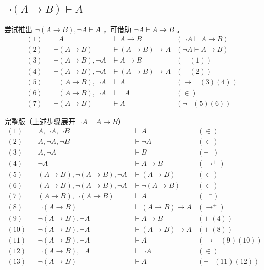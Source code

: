 \documentclass[UTF8]{ctexart}
\begin{document}
    
    \newpage
    \subsection*{$\lnot(A \to B) \vdash A$}
    尝试推出 $\lnot (A \to B), \lnot A \vdash A$ ，可借助 $\lnot A \vdash A \to B$ 。
    \begin{align*}
        (1) && \lnot A & \vdash A \to B & (\lnot A \vdash A \to B) \\
        (2) && \lnot (A \to B) & \vdash (A\to B) \to A & (\lnot A \vdash A \to B) \\
        (3) && \lnot (A \to B), \lnot A & \vdash A \to B & (+\ (1)) \\
        (4) && \lnot (A \to B), \lnot A & \vdash (A \to B) \to A & (+\ (2)) \\
        (5) && \lnot (A \to B), \lnot A & \vdash A & (\to^{-}\ (3)(4)) \\
        (6) && \lnot (A \to B), \lnot A & \vdash \lnot A & (\in) \\
        (7) && \lnot (A \to B) & \vdash A & (\lnot^{-}\ (5)(6))
    \end{align*} \par
    完整版（上述步骤展开 $\lnot A \vdash A \to B$）
    \begin{align*}
        (1) && A, \lnot A, \lnot B & \vdash A & (\in) \\
        (2) && A, \lnot A, \lnot B & \vdash \lnot A & (\in) \\
        (3) && A, \lnot A & \vdash B & (\lnot^{-}) \\
        (4) && \lnot A & \vdash A \to B & (\to^{+}) \\
        (5) && (A \to B), \lnot (A \to B), \lnot A & \vdash (A \to B) & (\in) \\
        (6) && (A \to B), \lnot (A \to B), \lnot A & \vdash \lnot (A \to B) & (\in) \\
        (7) && (A \to B), \lnot (A \to B) & \vdash A & (\lnot^{-}) \\
        (8) && \lnot (A \to B) & \vdash (A \to B) \to A & (\to^{+}) \\
        (9) && \lnot (A \to B), \lnot A & \vdash A \to B & (+\ (4)) \\
        (10) && \lnot (A \to B), \lnot A & \vdash (A \to B) \to A & (+\ (8)) \\
        (11) && \lnot (A \to B), \lnot A & \vdash A & (\to^{-}\ (9)(10)) \\
        (12) && \lnot (A \to B), \lnot A & \vdash \lnot A & (\in) \\
        (13) && \lnot (A \to B) & \vdash A & (\lnot^{-}\ (11)(12))
    \end{align*}
\end{document}
